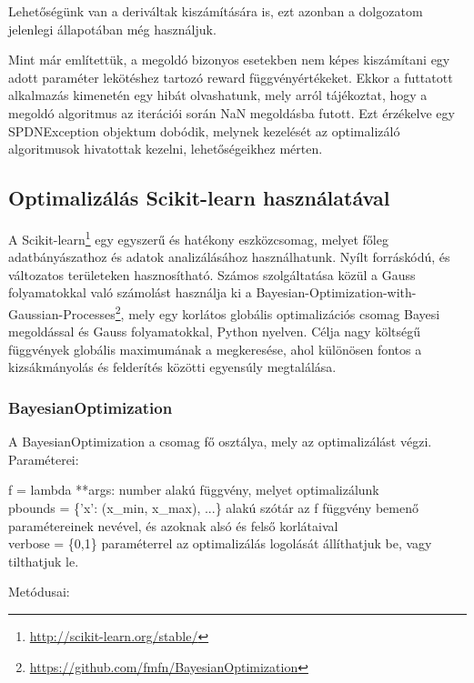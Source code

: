 Lehetőségünk van a deriváltak kiszámítására is, ezt azonban a dolgozatom jelenlegi állapotában még használjuk.

Mint már említettük, a megoldó bizonyos esetekben nem képes kiszámítani egy adott paraméter lekötéshez tartozó reward függvényértékeket. Ekkor a futtatott alkalmazás kimenetén egy hibát olvashatunk, mely arról tájékoztat, hogy a megoldó algoritmus az iterációi során NaN megoldásba futott. Ezt érzékelve egy SPDNException objektum dobódik, melynek kezelését az optimalizáló algoritmusok hivatottak kezelni, lehetőségeikhez mérten.
\subsection{Optimalizálás Scikit-learn használatával}
A Scikit-learn\footnote{\url{http://scikit-learn.org/stable/}} egy egyszerű és hatékony eszközcsomag, melyet főleg adatbányászathoz és adatok analizálásához használhatunk. Nyílt forráskódú, és változatos területeken hasznosítható. Számos szolgáltatása közül a Gauss folyamatokkal való számolást használja ki a Bayesian-Optimization-with-Gaussian-Processes\footnote{\url{https://github.com/fmfn/BayesianOptimization}}, mely egy korlátos globális optimalizációs csomag Bayesi megoldással és Gauss folyamatokkal, Python nyelven. Célja nagy költségű függvények globális maximumának a megkeresése, ahol különösen fontos a kizsákmányolás és felderítés közötti egyensúly megtalálása.

\subsubsection{BayesianOptimization}

A BayesianOptimization a csomag fő osztálya, mely az optimalizálást végzi. Paraméterei:

f = lambda **args: number alakú függvény, melyet optimalizálunk\\
pbounds = \{'x': (x\_min, x\_max), ...\} alakú szótár %
az f függvény bemenő paramétereinek nevével, és azoknak alsó és felső korlátaival\\
verbose = \{0,1\} paraméterrel az optimalizálás logolását állíthatjuk be, vagy tilthatjuk le.

Metódusai:

